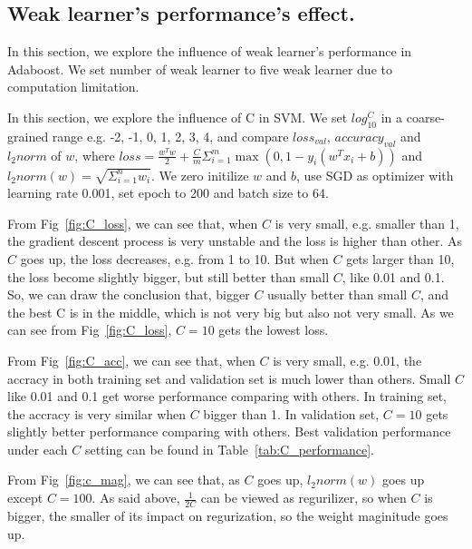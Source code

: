 \documentclass[journal, a4paper]{IEEEtran}
\begin{document}
\subsection{Weak learner's performance's effect.}
In this section, we explore the influence of weak learner's performance in Adaboost. We set number of weak learner to five weak learner due to computation limitation. \par 
In this section, we explore the influence of C in SVM. We set $log_{10}^{C}$ in a coarse-grained range e.g. -2, -1, 0, 1, 2, 3, 4, and compare $loss_{val}$,  $accuracy_{val}$ and $l_2norm$ of $w$, where $loss =  \frac{w^Tw}{2} + \frac{C}{m}\Sigma_{i=1}^m \max(0, 1 - y_i(w^Tx_i + b))$ and $ l_2norm(w) = \sqrt{\Sigma_{i=1}^n w_i}$. We zero initilize $w$ and $b$, use SGD as optimizer with learning rate 0.001, set epoch to 200 and batch size to 64. \par
From Fig~\ref{fig:C_loss}, we can see that, when $C$ is very small, e.g. smaller than 1, the gradient descent process is very unstable and the loss is higher than other. As $C$ goes up, the loss decreases, e.g. from 1 to 10. But when $C$ gets larger than 10, the loss become slightly bigger, but still better than small $C$, like 0.01 and 0.1. So, we can draw the conclusion that, bigger $C$ usually better than small $C$, and the best C is in the middle, which is not very big but also not very small. As we can see from Fig~\ref{fig:C_loss}, $C = 10$ gets the lowest loss.   \par
From Fig~\ref{fig:C_acc}, we can see that, when $C$ is very small, e.g. 0.01, the accracy in both training set and validation set is much lower than others. Small $C$ like 0.01 and 0.1 get worse performance comparing with others. In training set, the accracy is very similar when $C$ bigger than 1. In validation set, $C = 10$ gets slightly better performance comparing with others. Best validation performance under each $C$ setting can be found in Table~\ref{tab:C_performance}. \par
From Fig~\ref{fig:c_mag}, we can see that, as $C$ goes up, $l_2norm(w)$ goes up except $C = 100$. As said above, $\frac{1}{2C}$ can be viewed as regurilizer, so when $C$ is bigger, the smaller of its impact on regurization, so the weight maginitude goes up. \par
\end{document}
